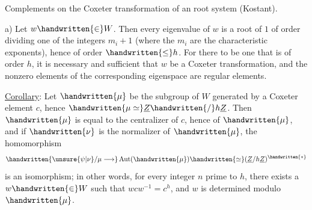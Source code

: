 Complements on the Coxeter transformation of an  root system (Kostant).

a) Let $w\handwritten{\in}W$. Then every eigenvalue of $w$ is a root of $1$ of order dividing one of the integers $m_i+1$ (where the $m_i$ are the characteristic exponents), hence of order $\handwritten{\leq}h$. For there to be one that is of order $h$, it is necessary and sufficient that $w$ be a Coxeter transformation, and the nonzero elements of the corresponding eigenspace are regular elements.

\uline{Corollary}: Let $\handwritten{\mu}$ be the subgroup of $W$ generated by a Coxeter element $c$, hence $\handwritten{\mu\simeq}\underline{Z}\handwritten{/}h\underline{Z}$. Then $\handwritten{\mu}$ is equal to the centralizer of $c$, hence of $\handwritten{\mu}$, and if $\handwritten{\nu}$ is the normalizer of $\handwritten{\mu}$, the homomorphism
\[
\handwritten{\unsure{\psi|\nu}/\mu\longrightarrow}\operatorname{Aut}(\handwritten{\mu})\handwritten{\simeq}(\underline{Z}/h\underline{Z})^{\handwritten{*}}
\]
\margin{\handwritten{What extension of $(\unsure{Z|\mathbb{Z}}/hZ]^{*}$ by $Z/hZ$ does one obtain?}}
is an isomorphism; in other words, for every integer $n$ prime to $h$, there exists a $w\handwritten{\in}W$ such that $wcw^{-1}=c^h$, and $w$ is determined modulo $\handwritten{\mu}$.

